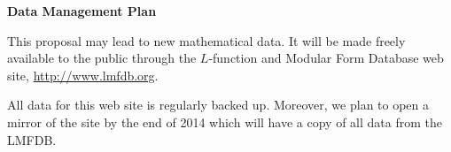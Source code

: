 \documentclass[12pt]{article}
\begin{document}
\begin{center}
\textbf{\large  Data Management Plan}
\end{center}
\bigskip

This proposal may lead to new mathematical data.  It will be made freely
available to the public through the $L$-function and Modular Form
Database web site, \url{http://www.lmfdb.org}.

All data for this web site is regularly backed up.  Moreover, we plan to
open a mirror of the site by the end of 2014 which will have a copy of 
all data from the \textsf{LMFDB}.
\end{document}
